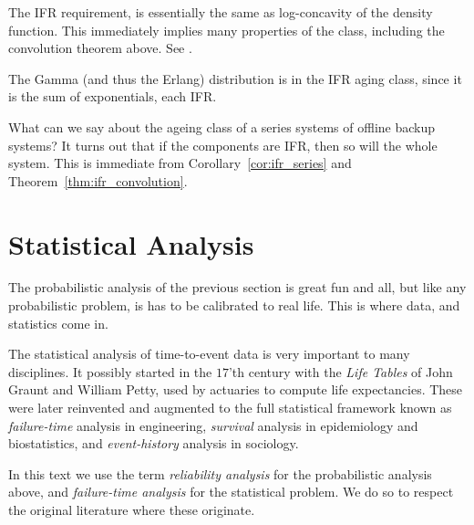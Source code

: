 \begin{extra}
The IFR requirement, is essentially the same as log-concavity of the density function.
This immediately implies many properties of the class, including the convolution theorem above.
See \cite{bagnoli_log-concave_2005}.
\end{extra}

\begin{example}
The Gamma (and thus the Erlang) distribution is in the IFR aging class, since it is the sum of exponentials, each IFR.
\end{example}

\begin{example}
What can we say about the ageing class of a series systems of offline backup systems? 
It turns out that if the components are IFR, then so will the whole system.
This is immediate from Corollary~\ref{cor:ifr_series} and Theorem~\ref{thm:ifr_convolution}.
\end{example}






\section{Statistical Analysis}
The probabilistic analysis of the previous section is great fun and all, but like any probabilistic problem, is has to be calibrated to real life. 
This is where data, and statistics come in.

The statistical analysis of time-to-event data is very important to many disciplines. 
It possibly started in the $17$'th century with the \emph{Life Tables} of John Graunt and
William Petty, used by actuaries to compute life expectancies. 
These were later reinvented and augmented to the full statistical framework known as \emph{failure-time} analysis in engineering, \emph{survival} analysis in epidemiology and biostatistics, and \emph{event-history} analysis in sociology. 

\begin{remark}
	In this text we use the term \emph{reliability analysis} for the probabilistic analysis above, and \emph{failure-time analysis} for the statistical problem. 
	We do so to respect the original literature where these originate. 
\end{remark}


